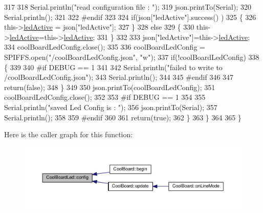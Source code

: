 \begin{DoxyCode}
317     
318             Serial.println(\textcolor{stringliteral}{"read configuration file : "});
319             json.printTo(Serial);
320             Serial.println();
321         
322 \textcolor{preprocessor}{        #endif}
323   
324             \textcolor{keywordflow}{if}(json[\textcolor{stringliteral}{"ledActive"}].success() )
325             \{
326                 this->\hyperlink{classCoolBoardLed_a5f17c135516fcf4b44ea8a096ba0177a}{ledActive} = json[\textcolor{stringliteral}{"ledActive"}]; 
327             \}
328             \textcolor{keywordflow}{else}
329             \{
330                 this->\hyperlink{classCoolBoardLed_a5f17c135516fcf4b44ea8a096ba0177a}{ledActive}=this->\hyperlink{classCoolBoardLed_a5f17c135516fcf4b44ea8a096ba0177a}{ledActive};          
331             \}
332             
333             json[\textcolor{stringliteral}{"ledActive"}]=this->\hyperlink{classCoolBoardLed_a5f17c135516fcf4b44ea8a096ba0177a}{ledActive};
334             coolBoardLedConfig.close();
335             
336             coolBoardLedConfig = SPIFFS.open(\textcolor{stringliteral}{"/coolBoardLedConfig.json"}, \textcolor{stringliteral}{"w"});
337             \textcolor{keywordflow}{if}(!coolBoardLedConfig)
338             \{
339             
340 \textcolor{preprocessor}{            #if DEBUG == 1 }
341 
342                 Serial.println(\textcolor{stringliteral}{"failed to write to /coolBoardLedConfig.json"});
343                 Serial.println();
344 
345 \textcolor{preprocessor}{            #endif}
346 
347                 \textcolor{keywordflow}{return}(\textcolor{keyword}{false});          
348             \}
349 
350             json.printTo(coolBoardLedConfig);
351             coolBoardLedConfig.close();
352 
353 \textcolor{preprocessor}{        #if DEBUG == 1}
354     
355             Serial.println(\textcolor{stringliteral}{"saved Led Config is : "});
356             json.printTo(Serial);
357             Serial.println();
358 
359 \textcolor{preprocessor}{        #endif}
360 
361             \textcolor{keywordflow}{return}(\textcolor{keyword}{true}); 
362         \}
363     \}   
364 
365 \}               
\end{DoxyCode}
Here is the caller graph for this function\+:\nopagebreak
\begin{figure}[H]
\begin{center}
\leavevmode
\includegraphics[width=350pt]{classCoolBoardLed_a1b60e5e30bea96c49ed62ed1bf1ffc8b_icgraph}
\end{center}
\end{figure}
\mbox{\label{classCoolBoardLed_a69f323359e0c9f797422f2152b5d41ef}} 
